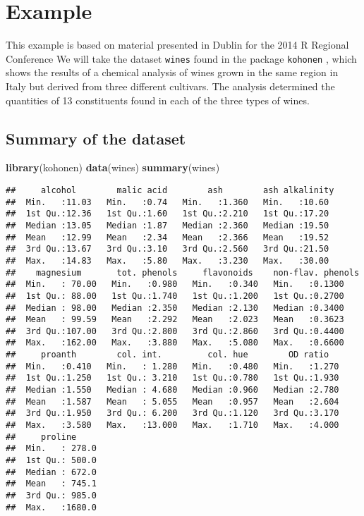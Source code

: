 \documentclass[]{book}
\newenvironment{Shaded}{\begin{snugshade}}{\end{snugshade}}
\newcommand{\KeywordTok}[1]{\textcolor[rgb]{0.13,0.29,0.53}{\textbf{{#1}}}}
\newcommand{\NormalTok}[1]{{#1}}
\begin{document}
\section{Example}\label{example}

This example is based on material presented in Dublin for the 2014 R
Regional Conference \citep{shane} We will take the dataset
\texttt{wines} found in the package \texttt{kohonen} \citep{R-kohonen},
which shows the results of a chemical analysis of wines grown in the
same region in Italy but derived from three different cultivars. The
analysis determined the quantities of 13 constituents found in each of
the three types of wines.

\subsection{Summary of the dataset}\label{summary-of-the-dataset}

\begin{Shaded}
\begin{Highlighting}[]
\KeywordTok{library}\NormalTok{(kohonen)}
\KeywordTok{data}\NormalTok{(wines)}
\KeywordTok{summary}\NormalTok{(wines)}
\end{Highlighting}
\end{Shaded}

\begin{verbatim}
##     alcohol        malic acid        ash        ash alkalinity 
##  Min.   :11.03   Min.   :0.74   Min.   :1.360   Min.   :10.60  
##  1st Qu.:12.36   1st Qu.:1.60   1st Qu.:2.210   1st Qu.:17.20  
##  Median :13.05   Median :1.87   Median :2.360   Median :19.50  
##  Mean   :12.99   Mean   :2.34   Mean   :2.366   Mean   :19.52  
##  3rd Qu.:13.67   3rd Qu.:3.10   3rd Qu.:2.560   3rd Qu.:21.50  
##  Max.   :14.83   Max.   :5.80   Max.   :3.230   Max.   :30.00  
##    magnesium       tot. phenols     flavonoids    non-flav. phenols
##  Min.   : 70.00   Min.   :0.980   Min.   :0.340   Min.   :0.1300   
##  1st Qu.: 88.00   1st Qu.:1.740   1st Qu.:1.200   1st Qu.:0.2700   
##  Median : 98.00   Median :2.350   Median :2.130   Median :0.3400   
##  Mean   : 99.59   Mean   :2.292   Mean   :2.023   Mean   :0.3623   
##  3rd Qu.:107.00   3rd Qu.:2.800   3rd Qu.:2.860   3rd Qu.:0.4400   
##  Max.   :162.00   Max.   :3.880   Max.   :5.080   Max.   :0.6600   
##     proanth        col. int.         col. hue        OD ratio    
##  Min.   :0.410   Min.   : 1.280   Min.   :0.480   Min.   :1.270  
##  1st Qu.:1.250   1st Qu.: 3.210   1st Qu.:0.780   1st Qu.:1.930  
##  Median :1.550   Median : 4.680   Median :0.960   Median :2.780  
##  Mean   :1.587   Mean   : 5.055   Mean   :0.957   Mean   :2.604  
##  3rd Qu.:1.950   3rd Qu.: 6.200   3rd Qu.:1.120   3rd Qu.:3.170  
##  Max.   :3.580   Max.   :13.000   Max.   :1.710   Max.   :4.000  
##     proline      
##  Min.   : 278.0  
##  1st Qu.: 500.0  
##  Median : 672.0  
##  Mean   : 745.1  
##  3rd Qu.: 985.0  
##  Max.   :1680.0
\end{verbatim}
\end{document}
